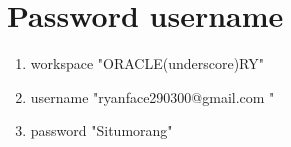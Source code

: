 \documentclass{article}
\begin{document}
\section{Password username}
      
      \begin{enumerate}
          \item workspace "ORACLE(underscore)RY"
          
          \item username "ryanface290300@gmail.com "
          
          \item password "Situmorang"
      \end{enumerate}
      
       
\end{document}
